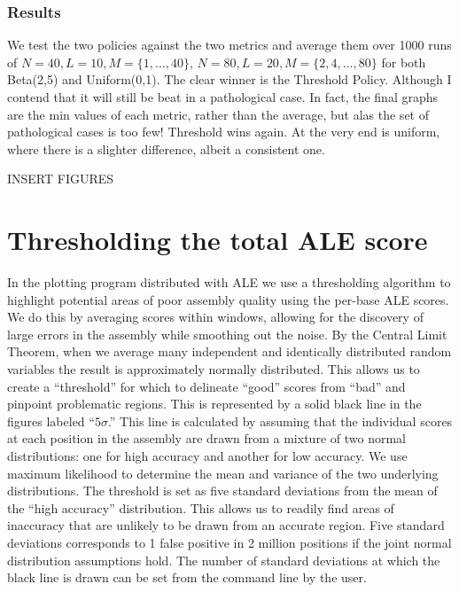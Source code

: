 \documentclass[phd,tocprelim]{cornell}
\begin{document}
\subsubsection{Results}

We test the two policies against the two metrics and average them over 1000 runs of $N = 40, L = 10, M = \{1, \ldots, 40\}$, $N = 80, L = 20, M = \{2, 4, \ldots, 80\}$ for both Beta(2,5) and Uniform(0,1). The clear winner is the Threshold Policy. Although I contend that it will still be beat in a pathological case. In fact, the final graphs are the min values of each metric, rather than the average, but alas the set of pathological cases is too few! Threshold wins again. At the very end is uniform, where there is a slighter difference, albeit a consistent one.

INSERT FIGURES


\section{Thresholding the total ALE score} %
\label{sec:Thresholding the total ALE score}

In the plotting program distributed with ALE we use a thresholding algorithm to highlight potential areas of poor assembly quality using the per-base ALE scores. We do this by averaging scores within windows, allowing for the discovery of large errors in the assembly while smoothing out the noise. By the Central Limit Theorem, when we average many independent and identically distributed random variables the result is approximately normally distributed. This allows us to create a “threshold” for which to delineate “good” scores from “bad” and pinpoint problematic regions. This is represented by a solid black line in the figures labeled “$5\sigma$.” This line is calculated by assuming that the individual scores at each position in the assembly are drawn from a mixture of two normal distributions: one for high accuracy and another for low accuracy. We use maximum likelihood to determine the mean and variance of the two underlying distributions. The threshold is set as five standard deviations from the mean of the “high accuracy” distribution. This allows us to readily find areas of inaccuracy that are unlikely to be drawn from an accurate region. Five standard deviations corresponds to 1 false positive in 2 million positions if the joint normal distribution assumptions hold.  The number of standard deviations at which the black line is drawn can be set from the command line by the user.
\end{document}
